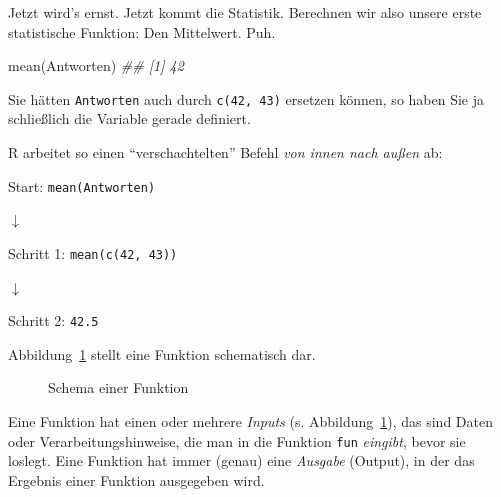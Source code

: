 \documentclass[
  letterpaper,
  oneside,
  open=any]{scrbook}
\newenvironment{Shaded}{\begin{snugshade}}{\end{snugshade}}
\newcommand{\DocumentationTok}[1]{\textcolor[rgb]{0.37,0.37,0.37}{\textit{#1}}}
\newcommand{\FunctionTok}[1]{\textcolor[rgb]{0.28,0.35,0.67}{#1}}
\newcommand{\NormalTok}[1]{\textcolor[rgb]{0.00,0.23,0.31}{#1}}
\theoremstyle{definition}
\theoremstyle{definition}
\theoremstyle{definition}
\theoremstyle{remark}
\begin{document}
Jetzt wird's ernst. Jetzt kommt die Statistik. Berechnen wir also unsere
erste statistische Funktion: Den Mittelwert. Puh.

\begin{Shaded}
\begin{Highlighting}[]
\FunctionTok{mean}\NormalTok{(Antworten)}
\DocumentationTok{\#\# [1] 42}
\end{Highlighting}
\end{Shaded}

Sie hätten \texttt{Antworten} auch durch \texttt{c(42,\ 43)} ersetzen
können, so haben Sie ja schließlich die Variable gerade definiert.

R arbeitet so einen \enquote{verschachtelten} Befehl \emph{von innen
nach außen} ab:

Start: \texttt{mean(Antworten)}

{\(\downarrow\)}

Schritt 1: \texttt{mean(c(42,\ 43))}

{\(\downarrow\)}

Schritt 2: \texttt{42.5}

Abbildung~\ref{fig-function-schema} stellt eine Funktion schematisch
dar.

\begin{figure}


\caption{\label{fig-function-schema}Schema einer Funktion}

\end{figure}%

Eine Funktion hat einen oder mehrere \emph{Inputs} (s.
Abbildung~\ref{fig-function-schema}), das sind Daten oder
Verarbeitungshinweise, die man in die Funktion \texttt{fun}
\emph{eingibt}, bevor sie loslegt. Eine Funktion hat immer (genau) eine
\emph{Ausgabe} (Output), in der das Ergebnis einer Funktion ausgegeben
wird.
\end{document}
